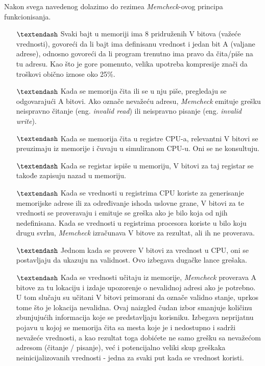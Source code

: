 \documentclass[12pt,oneside]{memoir}
\theoremstyle{plain}
\theoremstyle{definition}
\begin{document}
Nakon svega navedenog dolazimo do rezimea \textit{Memcheck}-ovog principa funkcionisanja.
\begin{itemize}
\item[$\textendash$] Svaki bajt u memoriji ima 8 pridruženih V bitova (važeće vrednosti), govoreći da li bajt ima definisanu vrednost i jedan bit A (valjane adrese), odnosno govoreći da li program trenutno ima pravo da čita/piše na tu adresu. Kao što je gore pomenuto, velika upotreba kompresije znači da troškovi obično iznose oko 25\%.
\item[$\textendash$] Kada se memorija čita ili se u nju piše, pregledaju se odgovarajući A bitovi. Ako označe nevažeću adresu, \textit{Memcheck} emituje grešku neispravno čitanje (eng. \textit{invalid read}) ili neispravno pisanje (eng. \textit{invalid write}).
\item[$\textendash$] Kada se memorija čita u registre CPU-a, relevantni V bitovi se preuzimaju iz memorije i čuvaju u simuliranom CPU-u. Oni se ne konsultuju.
\item[$\textendash$] Kada se registar ispiše u memoriju, V bitovi za taj registar se takođe zapisuju nazad u memoriju.
\item[$\textendash$] Kada se vrednosti u registrima CPU koriste za generisanje memorijske adrese ili za određivanje ishoda uslovne grane, V bitovi za te vrednosti se proveravaju i emituje se greška ako je bilo koja od njih nedefinisana. Kada se vrednosti u registrima procesora koriste u bilo koju drugu svrhu, \textit{Memcheck} izračunava V bitove za rezultat, ali ih ne proverava.
\item[$\textendash$] Jednom kada se provere V bitovi za vrednost u CPU, oni se postavljaju da ukazuju na validnost. Ovo izbegava dugačke lance grešaka.
\item[$\textendash$] Kada se vrednosti učitaju iz memorije, \textit{Memcheck} proverava A bitove za tu lokaciju i izdaje upozorenje o nevalidnoj adresi ako je potrebno. U tom slučaju su učitani V bitovi primorani da označe validno stanje, uprkos tome što je lokacija nevalidna. Ovaj naizgled čudan izbor smanjuje količinu zbunjujućih informacija koje se predstavljaju korisniku. Izbegava neprijatnu pojavu u kojoj se memorija čita sa mesta koje je i nedostupno i sadrži nevažeće vrednosti, a kao rezultat toga dobićete ne samo grešku sa nevažećom adresom (čitanje / pisanje), već i potencijalno veliki skup greškaka neinicijalizovanih vrednosti - jedna za svaki put kada se vrednost koristi.
\end{itemize}
\end{document}
